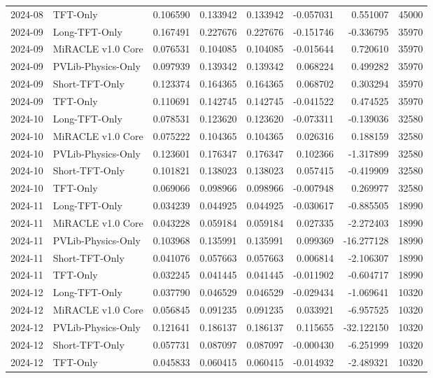 \begin{tabular}{llrrrrrr}
2024-08 & TFT-Only & 0.106590 & 0.133942 & 0.133942 & -0.057031 & 0.551007 & 45000 \\
2024-09 & Long-TFT-Only & 0.167491 & 0.227676 & 0.227676 & -0.151746 & -0.336795 & 35970 \\
2024-09 & MiRACLE v1.0 Core & 0.076531 & 0.104085 & 0.104085 & -0.015644 & 0.720610 & 35970 \\
2024-09 & PVLib-Physics-Only & 0.097939 & 0.139342 & 0.139342 & 0.068224 & 0.499282 & 35970 \\
2024-09 & Short-TFT-Only & 0.123374 & 0.164365 & 0.164365 & 0.068702 & 0.303294 & 35970 \\
2024-09 & TFT-Only & 0.110691 & 0.142745 & 0.142745 & -0.041522 & 0.474525 & 35970 \\
2024-10 & Long-TFT-Only & 0.078531 & 0.123620 & 0.123620 & -0.073311 & -0.139036 & 32580 \\
2024-10 & MiRACLE v1.0 Core & 0.075222 & 0.104365 & 0.104365 & 0.026316 & 0.188159 & 32580 \\
2024-10 & PVLib-Physics-Only & 0.123601 & 0.176347 & 0.176347 & 0.102366 & -1.317899 & 32580 \\
2024-10 & Short-TFT-Only & 0.101821 & 0.138023 & 0.138023 & 0.057415 & -0.419909 & 32580 \\
2024-10 & TFT-Only & 0.069066 & 0.098966 & 0.098966 & -0.007948 & 0.269977 & 32580 \\
2024-11 & Long-TFT-Only & 0.034239 & 0.044925 & 0.044925 & -0.030617 & -0.885505 & 18990 \\
2024-11 & MiRACLE v1.0 Core & 0.043228 & 0.059184 & 0.059184 & 0.027335 & -2.272403 & 18990 \\
2024-11 & PVLib-Physics-Only & 0.103968 & 0.135991 & 0.135991 & 0.099369 & -16.277128 & 18990 \\
2024-11 & Short-TFT-Only & 0.041076 & 0.057663 & 0.057663 & 0.006814 & -2.106307 & 18990 \\
2024-11 & TFT-Only & 0.032245 & 0.041445 & 0.041445 & -0.011902 & -0.604717 & 18990 \\
2024-12 & Long-TFT-Only & 0.037790 & 0.046529 & 0.046529 & -0.029434 & -1.069641 & 10320 \\
2024-12 & MiRACLE v1.0 Core & 0.056845 & 0.091235 & 0.091235 & 0.033921 & -6.957525 & 10320 \\
2024-12 & PVLib-Physics-Only & 0.121641 & 0.186137 & 0.186137 & 0.115655 & -32.122150 & 10320 \\
2024-12 & Short-TFT-Only & 0.057731 & 0.087097 & 0.087097 & -0.000430 & -6.251999 & 10320 \\
2024-12 & TFT-Only & 0.045833 & 0.060415 & 0.060415 & -0.014932 & -2.489321 & 10320 \\
\bottomrule
\end{tabular}
